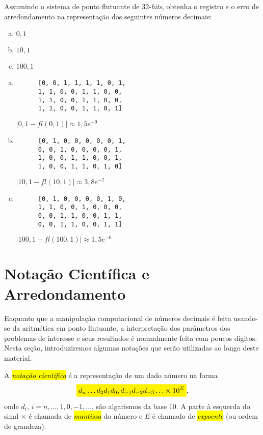 \begin{exer}
  Assumindo o sistema de ponto flutuante de $32$-{\it bits}, obtenha o registro e o erro de arredondamento na representação dos seguintes números decimais:
  \begin{enumerate}[a)]
  \item $0,1$
  \item $10,1$
  \item $100,1$
  \end{enumerate}
\end{exer}
\begin{resp}
  \begin{enumerate}[a)]
  \item %
    \begin{lstlisting}
      [0, 0, 1, 1, 1, 1, 0, 1,
      1, 1, 0, 0, 1, 1, 0, 0,
      1, 1, 0, 0, 1, 1, 0, 0,
      1, 1, 0, 0, 1, 1, 0, 1]
    \end{lstlisting}
    $|0,1 - fl(0,1)| \approx 1,5e^{-9}$
  \item %
    \begin{lstlisting}
      [0, 1, 0, 0, 0, 0, 0, 1,
      0, 0, 1, 0, 0, 0, 0, 1,
      1, 0, 0, 1, 1, 0, 0, 1,
      1, 0, 0, 1, 1, 0, 1, 0]
    \end{lstlisting}
    $|10,1 - fl(10,1)| \approx 3,8e^{-7}$
  \item %
    \begin{lstlisting}
      [0, 1, 0, 0, 0, 0, 1, 0,
      1, 1, 0, 0, 1, 0, 0, 0,
      0, 0, 1, 1, 0, 0, 1, 1,
      0, 0, 1, 1, 0, 0, 1, 1]
    \end{lstlisting}
    $|100,1 - fl(100,1)| \approx 1,5e^{-6}$
  \end{enumerate}
\end{resp}


\section{Notação Científica e Arredondamento}\label{cap_aritm_sec_notcient}

Enquanto que a manipulação computacional de números decimais é feita usando-se da aritmética em ponto flutuante, a interpretação dos parâmetros dos problemas de interesse e seus resultados é normalmente feita com poucos dígitos. Nesta seção, introduziremos algumas notações que serão utilizadas ao longo deste material.

A \hl{\emph{notação científica}} é a representação de um dado número na forma
\begin{equation}
  \hleq{d_{n}\ldots d_2d_1d_0,d_{-1}d_{-2}d_{-3}\ldots \times 10^{E}},
\end{equation}
onde $d_i$, $i=n, \ldots, 1, 0, -1, \ldots$, são algarismos da base 10. A parte à esquerda do sinal $\times$ é chamada de \hl{\emph{mantissa}} do número e $E$ é chamado de \hl{\emph{expoente}} (ou ordem de grandeza).

